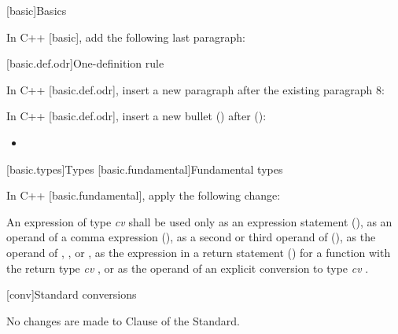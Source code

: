 
[basic]{Basics}

\pnum
In C++ [basic], add the following last paragraph:

\begin{std.txt}
\end{std.txt}



\setcounter{section}{1}
[basic.def.odr]{One-definition rule}

\pnum
In C++ [basic.def.odr], insert a new paragraph after the existing paragraph 8:

\begin{std.txt}
\end{std.txt}

\pnum
In C++ [basic.def.odr], insert a new bullet
() after
():
\begin{std.txt}
\begin{itemize}
\item {}
\end{itemize}
\end{std.txt}

\setcounter{section}{6}
[basic.types]{Types}
[basic.fundamental]{Fundamental types}

\pnum
In C++ [basic.fundamental], apply the following change:

\begin{std.txt}
An expression of type \emph{cv}  shall be used only as an expression
statement (), as an operand of a comma expression
(), as a second or
third operand of  (), as the operand of ,
,  or , as the
expression in a return statement () for a function with the return type
\emph{cv} , or as the operand of an explicit conversion to type
\emph{cv} .
\end{std.txt}

[conv]{Standard conversions}

No changes are made to Clause \the\value{chapter} of the \Cpp Standard.
